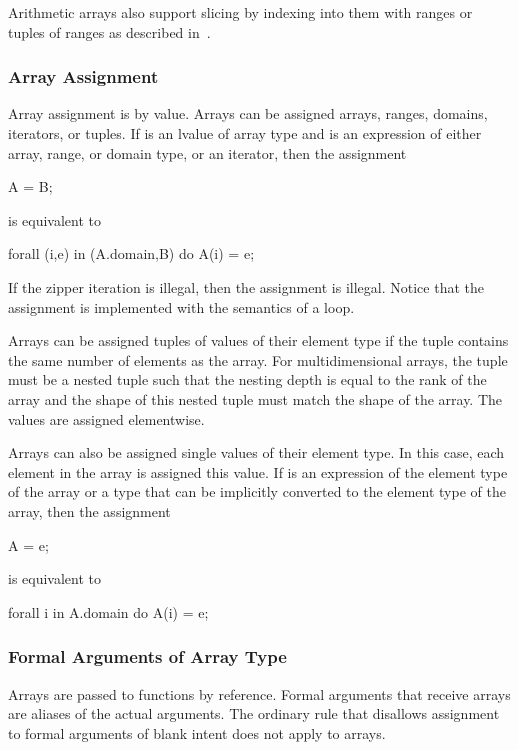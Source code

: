 Arithmetic arrays also support slicing by indexing into them with
ranges or tuples of ranges as described
in~.

\subsubsection{Array Assignment}
\label{Array_Assignment}

Array assignment is by value.  Arrays can be assigned arrays, ranges,
domains, iterators, or tuples.  If  is an lvalue of array type
and  is an expression of either array, range, or domain type,
or an iterator, then the assignment
\begin{chapel}
A = B;
\end{chapel}
is equivalent to
\begin{chapel}
forall (i,e) in (A.domain,B) do
  A(i) = e;
\end{chapel}
If the zipper iteration is illegal, then the assignment is illegal.
Notice that the assignment is implemented with the semantics of
a  loop.

Arrays can be assigned tuples of values of their element type if the
tuple contains the same number of elements as the array.  For
multidimensional arrays, the tuple must be a nested tuple such that
the nesting depth is equal to the rank of the array and the shape of
this nested tuple must match the shape of the array.  The values are
assigned elementwise.

Arrays can also be assigned single values of their element type.  In
this case, each element in the array is assigned this value.
If  is an expression of the element type of the array or a
type that can be implicitly converted to the element type of the
array, then the assignment
\begin{chapel}
A = e;
\end{chapel}
is equivalent to
\begin{chapel}
forall i in A.domain do
  A(i) = e;
\end{chapel}

\subsubsection{Formal Arguments of Array Type}
\label{Formal_Arguments_of_Array_Type}

Arrays are passed to functions by reference.  Formal arguments that
receive arrays are aliases of the actual arguments.  The ordinary rule
that disallows assignment to formal arguments of blank intent does not
apply to arrays.

